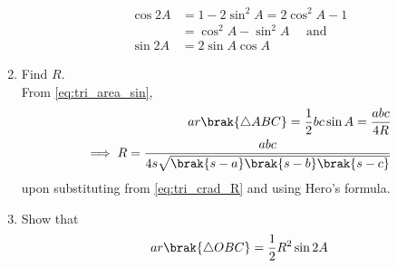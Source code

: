 \begin{enumerate}[label=\thesection.\arabic*.,ref=\thesection.\theenumi]
\label{eq:cos2x}
\begin{align}
\cos 2A &= 1 -2\sin^2 A = 2\cos^2 A - 1 
\\
&= \cos^2 A - \sin^2A \quad \text{ and }
\\
\sin 2A &= 2 \sin A \cos A
\label{eq:sin2x}
\end{align}
\item Find $R$.
\\
\solution From \eqref{eq:tri_area_sin}, 
\begin{align}
ar\brak{\triangle ABC} = \frac{1}{2}bc \sin A = \frac{abc}{4R}&
\\
\implies R = \frac{abc}{4s\sqrt{\brak{s-a}\brak{s-b}\brak{s-c}}}&
\end{align}
%
upon substituting from \eqref{eq:tri_crad_R} and using Hero's formula.
%
\item Show that
%
\begin{align}
\label{eq:circ_area_chord}
ar\brak{\triangle OBC} = \frac{1}{2}R^2\sin 2A
\end{align}
%
\iffalse
\item Find the circumradius of $\triangle ABC$ for $a = 5, b = 6, c = 4$.
%
\\
\solution The following python code calculates the circumradius
\begin{lstlisting}
codes/circle/tri_cradius.py
\end{lstlisting}
\fi


\end{enumerate}

